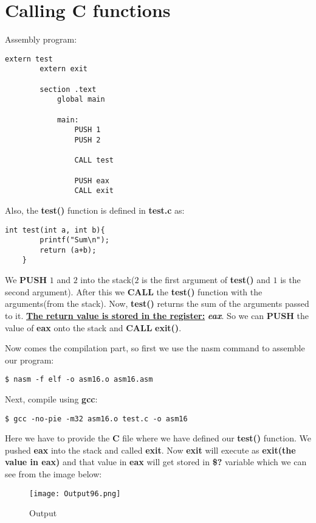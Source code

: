 \documentclass{article}
\makeatletter
\renewcommand\paragraph{\@startsection{paragraph}{4}{\z@}{-3.25ex \@plus -1ex \@minus -.2ex}{1.5ex \@plus .2ex}{\normalfont\normalsize\bfseries}}
\makeatother
\begin{document}
	\section{Calling C functions}\label{sec:sec1}
	\paragraph{}
	Assembly program:
	\begin{lstlisting}[frame=single, breaklines=true]
		extern test
		extern exit
		
		section .text
			global main
			
			main:
				PUSH 1
				PUSH 2
				
				CALL test
				
				PUSH eax
				CALL exit
	\end{lstlisting}
Also, the \textbf{test()} function is defined in \textbf{test.c} as:
\begin{lstlisting}[frame=single, breaklines=true]
	int test(int a, int b){
		printf("Sum\n");
		return (a+b);
	}
\end{lstlisting}
We \textbf{PUSH} $1$ and $2$ into the stack($2$ is the first argument of \textbf{test()} and $1$ is the second argument). After this we \textbf{CALL} the \textbf{test()} function with the arguments(from the stack). Now, \textbf{test()} returns the sum of the arguments passed to it. \underline{\textbf{The return value is stored in the register:}} \textbf{\textit{eax}}.
So we can \textbf{PUSH} the value of \textbf{eax} onto the stack and \textbf{CALL} \textbf{exit()}.

Now comes the compilation part, so first we use the nasm command to assemble our program:
\begin{lstlisting}[frame=single, breaklines=true]
	$ nasm -f elf -o asm16.o asm16.asm
\end{lstlisting}

Next, compile using \textbf{gcc}:
\begin{lstlisting}[frame=single, breaklines=true]
	$ gcc -no-pie -m32 asm16.o test.c -o asm16
\end{lstlisting}
Here we have to provide the \textbf{C} file where we have defined our \textbf{test()} function.
\newpage
We pushed \textbf{eax} into the stack and called \textbf{exit}. Now \textbf{exit} will execute as \textbf{exit(the value in eax)} and that value in \textbf{eax} will get stored in \textbf{\$?} variable which we can see from the image below:
\begin{figure}[h]
	\centering
	\texttt{[image: Output96.png]}
	\caption{Output}
	\label{fig:fig1}
\end{figure}
\end{document}
